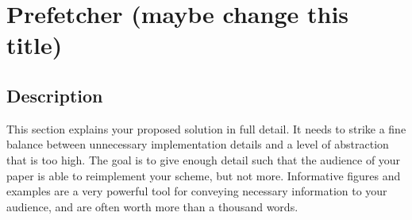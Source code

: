 \section{Prefetcher (maybe change this title)}
\subsection{Description}
This section explains your proposed solution in full detail.
It needs to strike a fine balance between unnecessary implementation
details and a level of abstraction that is too high.
The goal is to give enough detail such that the audience of
your paper is able to reimplement your scheme, but not more.
Informative figures and examples are a very powerful tool for
conveying necessary information to your audience, and are
often worth more than a thousand words.
